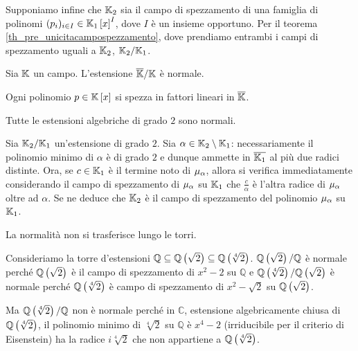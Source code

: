 \par Supponiamo infine che $\mathbb{K}_2$ sia il campo di spezzamento di una famiglia di polinomi $(p_i)_{i \in I} \in \mathbb{K}_1 \left [ x \right ]^I$, dove $I$ \`e un insieme opportuno. Per il teorema \ref{th_pre_unicitacampospezzamento}, dove prendiamo entrambi i campi di spezzamento uguali a $\mathbb{K}_2$, $\mathbb{K}_2/\mathbb{K}_1$. \EndProof
\begin{Corollary}
	Sia $\mathbb{K}$ un campo. L'estensione $\overline{\mathbb{K}}/\mathbb{K}$ \`e normale.
\end{Corollary}
\Proof Ogni polinomio $p \in \mathbb{K} \left [ x \right ]$ si spezza in fattori lineari in $\overline{\mathbb{K}}$. \EndProof
\begin{Theorem}
	Tutte le estensioni algebriche di grado $2$ sono normali.
\end{Theorem}
\Proof Sia $\mathbb{K}_2/\mathbb{K}_1$ un'estensione di grado $2$. Sia $\alpha \in \mathbb{K}_2 \setminus \mathbb{K}_1$: necessariamente il polinomio minimo di $\alpha$ \`e di grado $2$ e dunque ammette in $\overline{\mathbb{K}_1}$ al pi\`u due radici distinte. Ora, se $c \in \mathbb{K}_1$ \`e il termine noto di $\MinimalPolynomial{\alpha}$, allora si verifica immediatamente considerando il campo di spezzamento di $\MinimalPolynomial{\alpha}$ su $\mathbb{K}_1$ che $\frac{c}{\alpha}$ \`e l'altra radice di $\MinimalPolynomial{\alpha}$ oltre ad $\alpha$. Se ne deduce che $\mathbb{K}_2$ \`e il campo di spezzamento del polinomio $\MinimalPolynomial{\alpha}$ su $\mathbb{K}_1$. \EndProof
\begin{Theorem}
	La normalit\`a non si trasferisce lungo le torri.
\end{Theorem}
\Proof Consideriamo la torre d'estensioni $\mathbb{Q} \subseteq \mathbb{Q} \left ( \sqrt{2} \right ) \subseteq \mathbb{Q} \left ( \sqrt[4]{2} \right )$. $\mathbb{Q} \left ( \sqrt{2} \right )/\mathbb{Q}$ \`e normale perch\'e $\mathbb{Q} \left ( \sqrt{2} \right )$ \`e il campo di spezzamento di $x^2 - 2$ su $\mathbb{Q}$ e $\mathbb{Q} \left ( \sqrt[4]{2} \right )/\mathbb{Q} \left ( \sqrt{2} \right )$ \`e normale perch\'e $\mathbb{Q} \left ( \sqrt[4]{2} \right )$ \`e campo di spezzamento di $x^2 - \sqrt{2}$ su $\mathbb{Q} \left ( \sqrt{2} \right )$.
\par Ma $\mathbb{Q} \left ( \sqrt[4]{2} \right )/\mathbb{Q}$ non \`e normale perch\'e in $\mathbb{C}$, estensione algebricamente chiusa di $\mathbb{Q} \left ( \sqrt[4]{2} \right )$, il polinomio minimo di $\sqrt[4]{2}$ su $\mathbb{Q}$ \`e $x^4 - 2$ (irriducibile per il criterio di Eisenstein) ha la radice $i\sqrt[4]{2}$ che non appartiene a $\mathbb{Q} \left ( \sqrt[4]{2} \right )$. \EndProof
